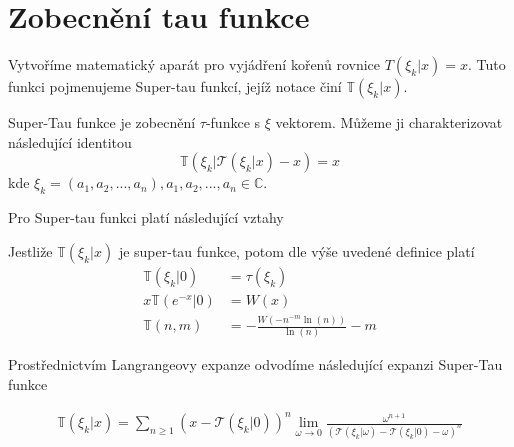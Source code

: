 \section{Zobecnění tau funkce}

Vytvoříme matematický aparát pro vyjádření kořenů
rovnice \(T(\xi_k | x) =x\). Tuto funkci pojmenujeme
Super-tau funkcí, jejíž notace činí \(\mathbb{T}(\xi_k | x)\).

\begin{definition}
      Super-Tau funkce je zobecnění \(\tau\)-funkce s \(\xi\) 
      vektorem. Můžeme ji charakterizovat následující identitou
      \[\mathbb{T}(\xi_k | \mathcal{T}(\xi_k | x) - x ) = x\]
      kde \(\xi_k = (a_1, a_2, ..., a_n), a_1, a_2, ..., a_n \in \mathbb{C}\).
\end{definition}

Pro Super-tau funkci platí následující vztahy

\begin{corollary}
      Jestliže \(\mathbb{T}(\xi_k | x)\) je super-tau 
      funkce, potom dle výše uvedené definice platí
      \begin{align}
            \mathbb{T}(\xi_k |0) &=\tau(\xi_k) \\
            x\mathbb{T}(e^{-x} | 0) &= W(x) \\
            \mathbb{T}(n, m) &= - \frac{W(-n^{-m}
            \ln(n))}{\ln(n)} - m
      \end{align}
\end{corollary}

Prostřednictvím Langrangeovy expanze 
odvodíme následující expanzi Super-Tau funkce

\begin{align}
      \mathbb{T}(\xi_k | x) = \sum_{n\geq 1}(x -
      \mathcal{T}(\xi_k | 0))^n \lim_{\omega \to 
      0}  \frac{\omega^{n+1}}{(\mathcal{T}(\xi_k 
      | \omega) - \mathcal{T}(\xi_k | 0) - \omega)^n}
\end{align}
